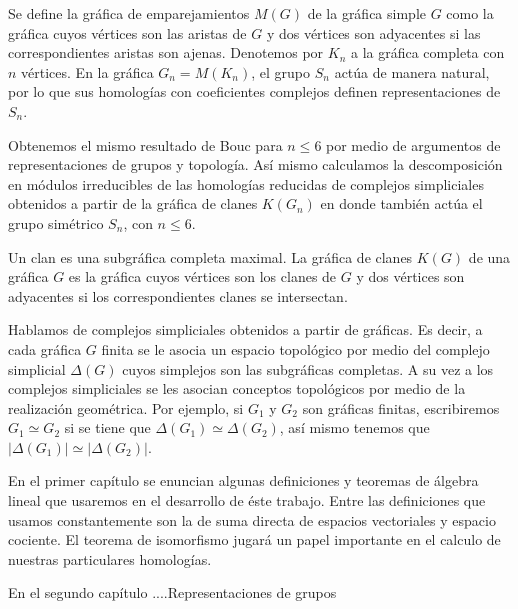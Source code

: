 \documentclass[12pt]{book}
\newtheorem{theorem}{Teorema}[section]
\theoremstyle{definition}
\newcounter{in}
\newcounter{ini}
\begin{document}
Se define la gráfica de emparejamientos $M(G)$ de la gráfica simple
$G$ como la gráfica cuyos vértices son las aristas de $G$ y dos
vértices son adyacentes si las correspondientes aristas son
ajenas. Denotemos por $K_{n}$ a la gráfica completa con $n$ vértices. En
la gráfica $G_{n}=M(K_{n})$, el grupo $S_{n}$ actúa de manera natural, por
lo que sus homologías con coeficientes complejos definen
representaciones de $S_{n}$. 

Obtenemos el mismo resultado de Bouc para $n\leq 6$ por medio de
argumentos de representaciones de grupos y topología. Así mismo
calculamos la descomposición en módulos irreducibles de las homologías
reducidas de complejos simpliciales obtenidos a partir de la
gráfica de clanes $K(G_{n})$ en donde también actúa el grupo simétrico
$S_{n}$, con $n\leq 6$.

Un clan es una subgráfica completa maximal. La gráfica de clanes
$K(G)$ de una gráfica $G$ es la gráfica cuyos vértices son los clanes
de $G$ y dos vértices son adyacentes si los correspondientes clanes se
intersectan.

Hablamos de complejos simpliciales obtenidos a partir de gráficas. Es
decir, a cada gráfica $G$ finita se le asocia un espacio topológico
por medio del complejo simplicial $\Delta(G)$ cuyos simplejos son las
subgráficas completas. A su vez a los complejos simpliciales se les
asocian conceptos topológicos por medio de la realización
geométrica. Por ejemplo, si $G_{1}$ y $G_{2}$ son gráficas finitas,
escribiremos $G_{1}\simeq G_{2}$ si se tiene que
$\Delta(G_{1})\simeq\Delta(G_{2})$, así mismo tenemos que
$|\Delta(G_{1})|\simeq|\Delta(G_{2})|$.

En el primer capítulo se enuncian algunas definiciones y teoremas de
álgebra lineal que usaremos en el desarrollo de éste
trabajo. Entre las definiciones que usamos constantemente son la de suma directa de
espacios vectoriales y espacio cociente. El teorema de isomorfismo
jugará un papel importante en el calculo de nuestras particulares homologías.

En el segundo capítulo ....Representaciones de grupos
\end{document}
